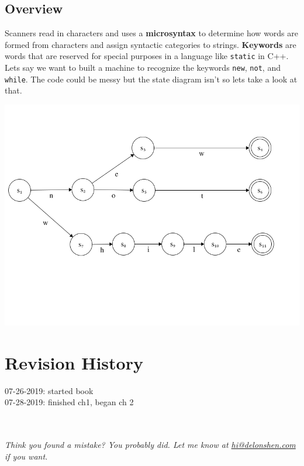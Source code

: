 \documentclass{article}
\begin{document}
\subsection{Overview}
Scanners read in characters and uses a \textbf{microsyntax} to determine how words are formed from characters and assign syntactic categories to strings. \textbf{Keywords} are words that are reserved for special purposes in a language like \texttt{static} in C++. Lets say we want to built a machine to recognize the keywords \texttt{new}, \texttt{not}, and \texttt{while}. The code could be messy but the state diagram isn't so lets take a look at that.
\begin{center}
\includegraphics[width=\linewidth]{nnw.png}
\end{center}

{\tiny
\section{Revision History}
07-26-2019: started book\\
07-28-2019: finished ch1, began ch 2\\
}
\\\\
\textit{Think you found a mistake? You probably did. Let me know at \href{mailto:hi@delonshen.com}{hi@delonshen.com} if you want.}
\end{document}
